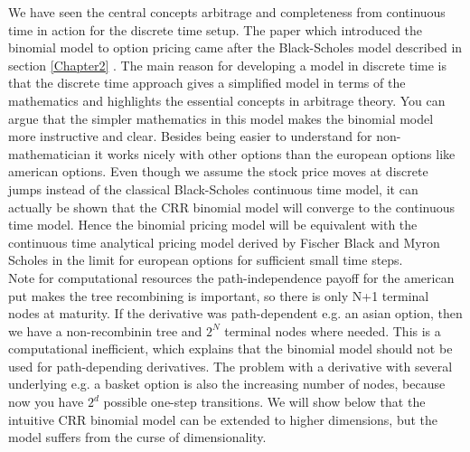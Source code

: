 We have seen the central concepts arbitrage and completeness from continuous time in action for the discrete time setup. The paper \parencite{CRR} which introduced the binomial model to option pricing came after the Black-Scholes model described in section \ref{Chapter2} \parencite{B-S-Paper}. The main reason for developing a model in discrete time is that the discrete time approach gives a simplified model in terms of the mathematics and highlights the essential concepts in arbitrage theory. You can argue that the simpler mathematics in this model makes the binomial model more instructive and clear. Besides being easier to understand for non-mathematician it works nicely with other options than the european options like american options. Even though we assume the stock price moves at discrete jumps instead of the classical Black-Scholes continuous time model, it can actually be shown that the CRR binomial model will converge to the continuous time model. Hence the binomial pricing model will be equivalent with the continuous time analytical pricing model derived by Fischer Black and Myron Scholes in the limit for european options for sufficient small time steps. \\

Note for computational resources the path-independence payoff for the american put makes the tree recombining is important, so there is only N+1 terminal nodes at maturity. If the derivative was path-dependent e.g. an asian option, then we have a non-recombinin tree and $2^{N}$ terminal nodes where needed. This is a computational inefficient, which explains that the binomial model should not be used for path-depending derivatives. The problem with a derivative with several underlying e.g. a basket option is also the increasing number of nodes, because now you have $2^d$ possible one-step transitions. We will show below that the intuitive CRR binomial model can be extended to higher dimensions, but the model suffers from the curse of dimensionality.

\newpage
